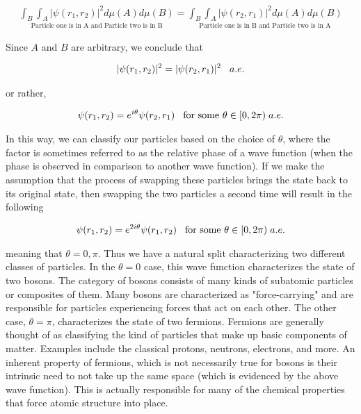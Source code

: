 \begin{equation}
	\begin{aligned}
		\underset{\text{Particle one is in A and Particle two is in B}}{\int_B \int_A |\psi(r_1,r_2)|^2 d\mu(A)d\mu(B)} = \underset{\text{Particle one is in B and Particle two is in A}}{\int_B \int_A |\psi(r_2,r_1)|^2 d\mu(A)d\mu(B)}
	\end{aligned}
\end{equation}

Since $A$ and $B$ are arbitrary, we conclude that 

\begin{equation}
	\begin{aligned}
		|\psi(r_1,r_2)|^2 = |\psi(r_2,r_1)|^2 \hspace{3mm}a.e.
	\end{aligned}
\end{equation}

or rather,

\begin{equation}
	\begin{aligned}
		\psi(r_1,r_2) = e^{i\theta} \psi(r_2,r_1) \hspace{3mm}\text{for some }\theta\in[0,2\pi) \hspace{1mm} a.e.
	\end{aligned}
\end{equation}

In this way, we can classify our particles based on the choice of $\theta$, where the factor is sometimes referred to as the relative phase of a wave function (when the phase is observed in comparison to another wave function). If we make the assumption that the process of swapping these particles brings the state back to its original state, then swapping the two particles a second time will result in the following 

\begin{equation}
	\begin{aligned}
		\psi(r_1,r_2) = e^{2i\theta} \psi(r_1,r_2) \hspace{3mm}\text{for some }\theta\in[0,2\pi) \hspace{1mm} a.e.
	\end{aligned}
\end{equation}

meaning that $\theta = 0,\pi$. Thus we have a natural split characterizing two different classes of particles. In the $\theta=0$ case, this wave function characterizes the state of two bosons. The category of bosons consists of many kinds of subatomic particles or composites of them. Many bosons are characterized as "force-carrying" and are responsible for particles experiencing forces that act on each other. The other case, $\theta=\pi$, characterizes the state of two fermions. Fermions are generally thought of as classifying the kind of particles that make up basic components of matter. Examples include the classical protons, neutrons, electrons, and more. An inherent property of fermions, which is not necessarily true for bosons is their intrinsic need to not take up the same space (which is evidenced by the above wave function). This is actually responsible for many of the chemical properties that force atomic structure into place.

